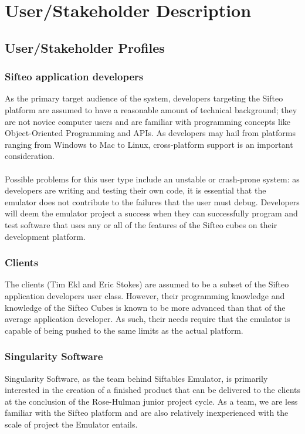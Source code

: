 \documentclass[12pt]{article}
\begin{document}
\section{User/Stakeholder Description}

               \subsection{User/Stakeholder Profiles}

                          \subsubsection{Sifteo application developers}
                          As the primary target audience of the system, developers targeting the Sifteo platform are assumed to have a reasonable amount of technical background; they are not novice computer users and are familiar with programming concepts like Object-Oriented Programming and \gls{API}s. As developers may hail from platforms ranging from Windows to Mac to Linux, cross-platform support is an important consideration.\\\\
                          Possible problems for this user type include an unstable or crash-prone system: as developers are writing and testing their own code, it is essential that the emulator does not contribute to the failures that the user must debug. Developers will deem the emulator project a success when they can successfully program and test software that uses any or all of the features of the Sifteo cubes on their development platform.

                          \subsubsection{Clients}
                          The clients (Tim Ekl and Eric Stokes) are assumed to be a subset of the Sifteo application developers user class. However, their programming knowledge and knowledge of the Sifteo Cubes is known to be more advanced than that of the average application developer. As such, their needs require that the emulator is capable of being pushed to the same limits as the actual platform.

                          \subsubsection{Singularity Software}
                          Singularity Software, as the team behind Siftables Emulator, is primarily interested in the creation of a finished product that can be delivered to the clients at the conclusion of the Rose-Hulman junior project cycle. As a team, we are less familiar with the Sifteo platform and are also relatively inexperienced with the scale of project the Emulator entails.
\end{document}
